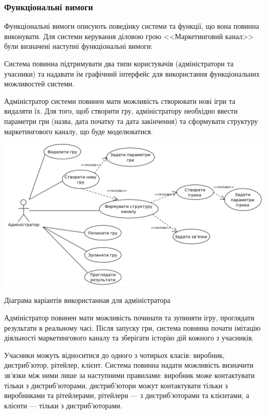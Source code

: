         \subsubsection{Функціональні вимоги}
Функціональні вимоги описують поведінку системи та функції, що вона повинна виконувати. Для системи керування діловою грою <<Маркетинговий канал>> були визначені наступні функціональні вимоги:
            \begin{longEnumerate}
\item Система повинна підтримувати два типи користувачів (адміністратори та учасники) та надавати їм графічний інтерфейс для використання функціональних можливостей системи.
\item Адміністратор системи повинен мати можливість створювати нові ігри та видаляти їх. Для того, щоб створити гру, адміністратору необхідно ввести параметри гри (назва, дата початку та дата закінчення) та сформувати структуру маркетингового каналу, що буде моделюватися. 

            \begin{stdfigure}
                \includegraphics[width=7in]{images/uml_uc_admin.png}
                \caption{Діаграма варіантів використанная для адміністратора}
                \label{fig:uml_uc_admin}
            \end{stdfigure}

\item Адміністратор повинен мати можливість починати та зупиняти ігру, проглядати результати в реальному часі. Після запуску гри, система повинна почати імітацію діяльності маркетингового каналу та зберігати історію дій кожного з учасників.
\item Учасники можуть відноситися до одного з чотирьох класів: виробник, дистриб’ютор, рітейлер, клієнт. Система повинна надати можливість визначити зв’язки між ними лише за наступними правилами: виробник може контактувати тільки з дистриб’юторами, дистриб’ютори можут контактувати тільки з виробниками та рітейлерами, рітейлери --- з дистриб’юторами та клієнтами, а клієнти --- тільки з дистриб’юторами.


\end{longEnumerate}

